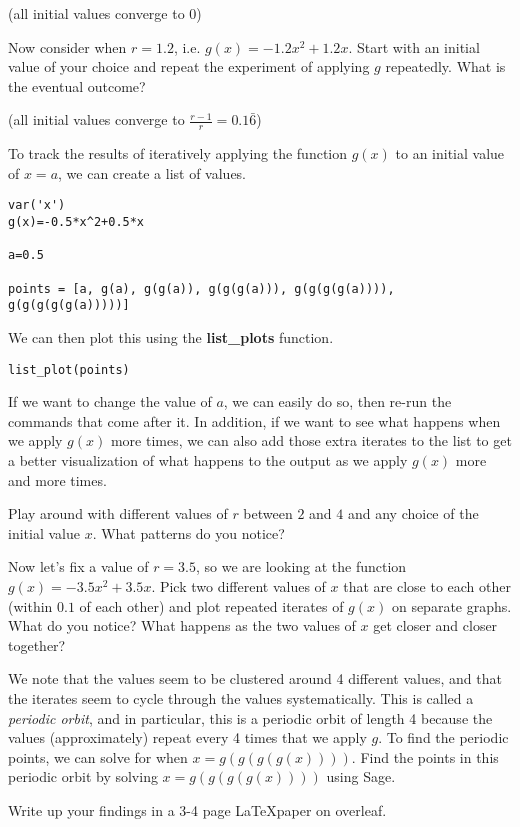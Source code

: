 (all initial values converge to $0$)

Now consider when $r=1.2$, i.e. $g(x)=-1.2x^2+1.2x$.
Start with an initial value of your choice and repeat
the experiment of applying $g$ repeatedly. What is the eventual outcome?

(all initial values converge to $\frac{r-1}{r}=0.1\bar{6}$)

To track the results of iteratively applying the function $g(x)$ to an initial
value of $x=a$, we can create a list of values.

\begin{verbatim}
var('x')
g(x)=-0.5*x^2+0.5*x

a=0.5

points = [a, g(a), g(g(a)), g(g(g(a))), g(g(g(g(a)))), g(g(g(g(g(a)))))]
\end{verbatim}

We can then plot this using the \textbf{list\_plots} function.

\begin{verbatim}
list_plot(points)
\end{verbatim}

If we want to change the value of $a$, we can easily do so, then re-run
the commands that come after it. In addition, if we want to see what
happens when we apply $g(x)$ more times, we can also add those
extra iterates to the list to get a better visualization of what happens
to the output as we apply $g(x)$ more and more times.

Play around with different values of $r$ between $2$ and $4$ and any
choice of the initial value $x$. What patterns do you notice?

Now let's fix a value of $r=3.5$, so we are looking at the function
$g(x)=-3.5x^2+3.5x$. Pick two different values of $x$ that are close to each other 
(within $0.1$ of each other) and plot repeated iterates of $g(x)$ on separate
graphs. What do you notice?
What happens as the two values of $x$ get closer and closer together?

We note that the values seem to be clustered around 4 different values,
and that the iterates seem to cycle through the values systematically. This is called
a \textit{periodic orbit}, and in particular, this is a periodic orbit of length 4 because
the values (approximately) repeat every 4 times that we apply $g$. To find
the periodic points, we can solve for when $x=g(g(g(g(x))))$. Find the points
in this periodic orbit by solving $x=g(g(g(g(x))))$ using Sage.

Write up your findings in a 3-4 page \LaTeX paper on overleaf.